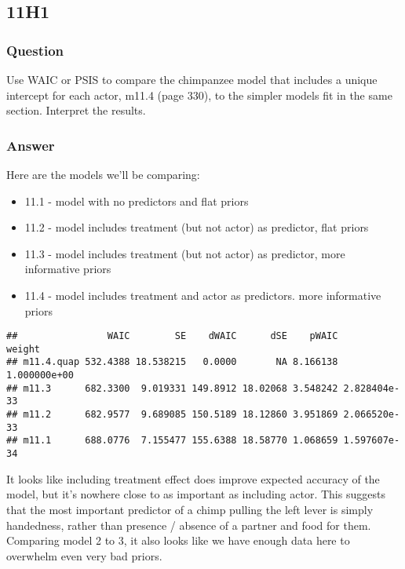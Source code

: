 \documentclass[
]{book}
\providecommand{\tightlist}{%
  \setlength{\itemsep}{0pt}\setlength{\parskip}{0pt}}
\begin{document}
\hypertarget{h1-4}{%
\subsection*{11H1}\label{h1-4}}

\hypertarget{question-93}{%
\subsubsection*{Question}\label{question-93}}

Use WAIC or PSIS to compare the chimpanzee model that includes a unique intercept for each actor, m11.4 (page 330), to the simpler models fit in the same section. Interpret the results.

\hypertarget{answer-93}{%
\subsubsection*{Answer}\label{answer-93}}

Here are the models we'll be comparing:

\begin{itemize}
\tightlist
\item
  11.1 - model with no predictors and flat priors
\item
  11.2 - model includes treatment (but not actor) as predictor, flat priors
\item
  11.3 - model includes treatment (but not actor) as predictor, more informative priors
\item
  11.4 - model includes treatment and actor as predictors. more informative priors
\end{itemize}

\begin{verbatim}
##                WAIC        SE    dWAIC      dSE    pWAIC       weight
## m11.4.quap 532.4388 18.538215   0.0000       NA 8.166138 1.000000e+00
## m11.3      682.3300  9.019331 149.8912 18.02068 3.548242 2.828404e-33
## m11.2      682.9577  9.689085 150.5189 18.12860 3.951869 2.066520e-33
## m11.1      688.0776  7.155477 155.6388 18.58770 1.068659 1.597607e-34
\end{verbatim}

It looks like including treatment effect does improve expected accuracy of the model, but it's nowhere close to as important as including actor. This suggests that the most important predictor of a chimp pulling the left lever is simply handedness, rather than presence / absence of a partner and food for them. Comparing model 2 to 3, it also looks like we have enough data here to overwhelm even very bad priors.
\end{document}
